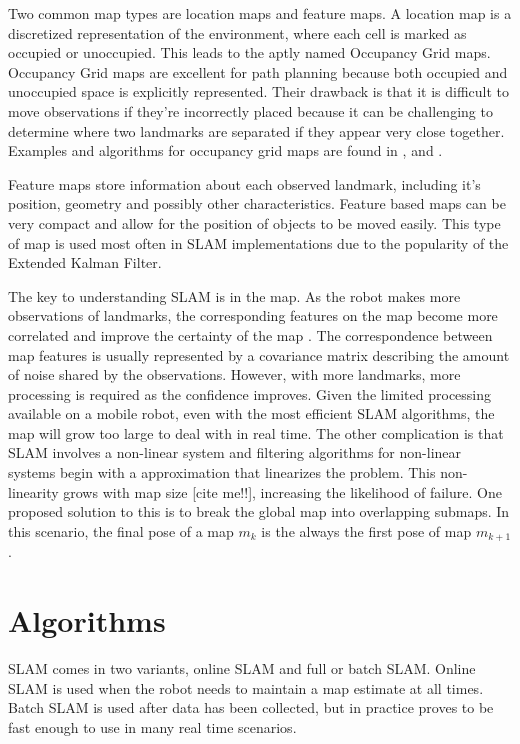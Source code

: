 \documentclass[12pt]{article}
\begin{document}
Two common map types are location maps and feature maps.  A location map is a discretized representation of the environment, where each cell is marked as occupied or unoccupied.  This leads to the aptly named Occupancy Grid maps. Occupancy Grid maps are excellent for path planning because both occupied and unoccupied space is explicitly represented.  Their drawback is that it is difficult to move observations if they’re incorrectly placed because it can be challenging to determine where two landmarks are separated if they appear very close together.   Examples and algorithms for occupancy grid maps are found in \cite{ThrunPR2005}, \cite{lee2007feature} and \cite{eliazar2004dp}.  

Feature maps store information about each observed landmark, including it’s position, geometry and possibly other characteristics.  Feature based maps can be very compact and allow for the position of objects to be moved easily.  This type of map is used most often in SLAM implementations due to the popularity of the Extended Kalman Filter.  

The key to understanding SLAM is in the map.  As the robot makes more observations of landmarks, the corresponding features on the map become more correlated and improve the certainty of the map \cite{durrant2006simultaneous}.  The correspondence between map features is usually represented by a covariance matrix describing the amount of noise shared by the observations. However, with more landmarks, more processing is required as the confidence improves.  Given the limited processing available on a mobile robot, even with the most efficient SLAM algorithms, the map will grow too large to deal with in real time.  The other complication is that SLAM involves a non-linear system and filtering algorithms for non-linear systems begin with a approximation that linearizes the problem.  This non-linearity grows with map size [cite me!!], increasing the likelihood of failure.  One proposed solution to this is to break the global map into overlapping submaps.  In this scenario, the final pose of a map $m_{k}$ is the always the first pose of map $m_{k+1}$.  

\section{Algorithms}
SLAM comes in two variants, online SLAM and full or batch SLAM.  Online SLAM is used when the robot needs to maintain a map estimate at all times.  Batch SLAM is used after data has been collected, but in practice proves to be fast enough to use in many real time scenarios.
\end{document}
